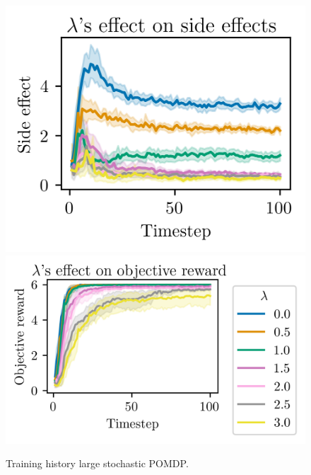 \documentclass[12pt,A4]{report}
\theoremstyle{definition}
\begin{document}
\begin{appendices}
\begin{figure}[H]
  \centering
  \includegraphics{"./figures/pomdp_16x16_stochastic_side_effects.png"}
  \includegraphics{"./figures/pomdp_16x16_stochastic_objective_reward.png"}
  \caption{Training history large stochastic POMDP.}
  \label{fig:apendix_results_pomdp_16x16_stochastic}
\end{figure}

\end{appendices}
\end{document}
